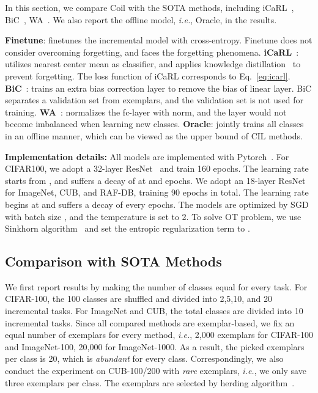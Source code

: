 \documentclass[sigconf]{acmart}
\newcommand{\ie}{\emph{i.e.}}
\newcommand{\bfname}[1]{{\bf #1}}
\newcommand{\name}{{\sc Coil }}
\begin{document}
 In this section, we compare \name with the SOTA methods, including iCaRL~\cite{rebuffi2017icarl}, BiC~\cite{wu2019large}, WA~\cite{zhao2020maintaining}.  We also report the offline model, \ie, Oracle, in the results.  

{ \bfname{Finetune}}: finetunes the incremental model with cross-entropy. Finetune does not consider overcoming forgetting, and faces the forgetting phenomena.
\bfname{iCaRL}~\cite{rebuffi2017icarl}: utilizes nearest center mean as classifier, and applies knowledge distillation~\cite{hinton2015distilling} to prevent forgetting. The loss function of iCaRL corresponds to Eq.~\ref{eq:icarl}.
{\bfname{BiC}~\cite{wu2019large}}: trains an extra bias correction layer to remove the bias of linear layer. BiC separates a validation set from exemplars, and the validation set is not used for training.
{\bfname{WA}~\cite{zhao2020maintaining}}: normalizes the fc-layer with  norm, and the layer would not become imbalanced when learning new classes. 
{\bfname{Oracle}}: jointly trains all classes in an offline manner, which can be viewed as the upper bound of CIL methods.


{\noindent \bf Implementation details:} All models are implemented with Pytorch~\cite{paszke2019pytorch}. For CIFAR100, we adopt a 32-layer ResNet~\cite{he2015residual} and train 160 epochs. The learning rate starts from , and suffers a decay of  at  and  epochs. We adopt an 18-layer ResNet  for ImageNet, CUB, and RAF-DB, training 90 epochs in total. The learning rate begins at  and suffers a decay of  every  epochs. The models are optimized by SGD with batch size , and the temperature  is set to 2. To solve OT problem, we use Sinkhorn algorithm~\cite{cuturi2013sinkhorn,sinkhorn1967concerning} and set the entropic regularization term  to .



\subsection{Comparison with SOTA Methods}

We first report results by making the number of classes equal for every task. For CIFAR-100, the 100 classes are shuffled and divided into 2,5,10, and 20  incremental tasks. For ImageNet and CUB, the total classes are divided into 10 incremental tasks. Since all compared methods are exemplar-based, we fix an equal number of exemplars for every method, \ie, 2,000 exemplars for CIFAR-100 and ImageNet-100, 20,000 for ImageNet-1000. As a result, the picked exemplars per class is 20, which is \emph{abundant} for every class.
Correspondingly, we also conduct the experiment on CUB-100/200 with \emph{rare} exemplars, \ie, we only save three exemplars per class. The exemplars are selected by herding algorithm~\cite{welling2009herding}.
\end{document}
